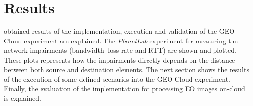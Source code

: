 \chapter{Results}
\label{chap:results}

 obtained results of the implementation, execution and
validation of the GEO-Cloud experiment are explained. The \emph{PlanetLab}
experiment for measuring the network impairments (bandwidth, loss-rate and
\ac{RTT}) are shown and plotted. These plots represents how the impairments
directly depends on the distance between both source and destination elements.
The next section shows the results of the execution of some defined scenarios into
the GEO-Cloud experiment. Finally, the evaluation of the implementation for processing
\ac{EO} images on-cloud is explained.





